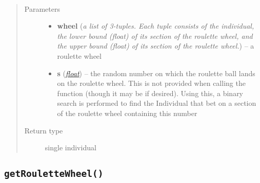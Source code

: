 \documentclass[letterpaper,10pt,english]{sphinxmanual}
\begin{document}
\begin{fulllineitems}
\label{Overview:rouletteWheelSelect}~\begin{quote}\begin{description}
\item[{Parameters}] \leavevmode\begin{itemize}
\item {} 
\textbf{wheel} (\emph{a list of 3-tuples. Each tuple consists of the individual, the lower bound (float) of its section of the roulette wheel, and the upper bound (float) of its section of the roulette wheel.}) -- a roulette wheel

\item {} 
\textbf{s} (\href{http://docs.python.org/library/functions.html\#float}{\emph{float}}) -- the random number on which the roulette ball lands on the roulette wheel. This is not provided when calling the function (though it may be if desired). Using this, a binary search is performed to find the Individual that bet on a section of the roulette wheel containing this number

\end{itemize}

\item[{Return type}] \leavevmode
single individual

\end{description}\end{quote}

\end{fulllineitems}



\subsection{\texttt{getRouletteWheel()}}
\label{Overview:getroulettewheel}
\end{document}
